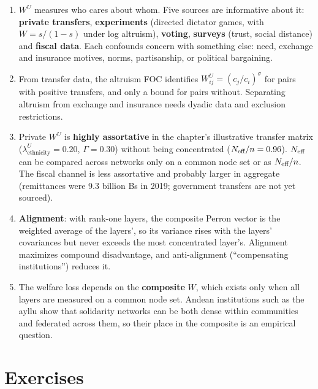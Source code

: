 \documentclass[../structural_economics_book.tex]{subfiles}
\begin{document}
\begin{enumerate}
\item $W^U$ measures who cares about whom. Five sources are informative about it: \textbf{private transfers}, \textbf{experiments} (directed dictator games, with $W = s/(1-s)$ under log altruism), \textbf{voting}, \textbf{surveys} (trust, social distance) and \textbf{fiscal data}. Each confounds concern with something else: need, exchange and insurance motives, norms, partisanship, or political bargaining.

\item From transfer data, the altruism FOC identifies $W^U_{ij} = (c_j/c_i)^\sigma$ for pairs with positive transfers, and only a bound for pairs without. Separating altruism from exchange and insurance needs dyadic data and exclusion restrictions.

\item Private $W^U$ is \textbf{highly assortative} in the chapter's illustrative transfer matrix ($\lambda^U_{\text{ethnicity}} = 0.20$, $\Gamma = 0.30$) without being concentrated ($N_{\text{eff}}/n = 0.96$). $N_{\text{eff}}$ can be compared across networks only on a common node set or as $N_{\text{eff}}/n$. The fiscal channel is less assortative and probably larger in aggregate (remittances were 9.3 billion Bs in 2019; government transfers are not yet sourced).

\item \textbf{Alignment}: with rank-one layers, the composite Perron vector is the weighted average of the layers', so its variance rises with the layers' covariances but never exceeds the most concentrated layer's. Alignment maximizes compound disadvantage, and anti-alignment (``compensating institutions'') reduces it.

\item The welfare loss depends on the \textbf{composite} $W$, which exists only when all layers are measured on a common node set. Andean institutions such as the ayllu show that solidarity networks can be both dense within communities and federated across them, so their place in the composite is an empirical question.
\end{enumerate}


\section{Exercises}
\label{ch22:sec:exercises}
\end{document}
